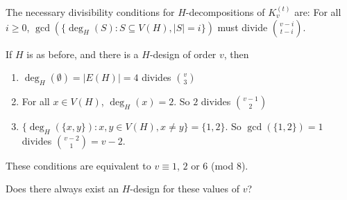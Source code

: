 \begin{frame}



The necessary divisibility conditions for $H$-decompositions of $K_v^{(t)}$
are:
For all $i \geq 0$, $\gcd \left( \{\deg_H(S) : S \subseteq V(H), |S| = i\}
\right)$ must divide ${v-i \choose t-i}$.

\pause
\begin{example}
If $H$ is as before, and there is a $H$-design of order $v$, then
\begin{enumerate}
    \item $\deg_H(\emptyset) = |E(H)| = 4$ divides ${v \choose 3}$
    \pause
    \item For all $x \in V(H)$, $\deg_H(x) = 2$. So $2$ divides ${v-1 \choose 2}$
    \pause
    \item $\{\deg_H(\{x, y\}) : x, y \in V(H), x \neq y\} = \{1, 2\}$.
    So $\gcd(\{1, 2\}) = 1$ divides ${v-2 \choose 1} = v-2$.
\end{enumerate}
\pause
These conditions are equivalent to $v \equiv 1$, $2$ or $6$ (mod $8$).
\end{example}

Does there always exist an $H$-design for these values of $v$?

\end{frame}


